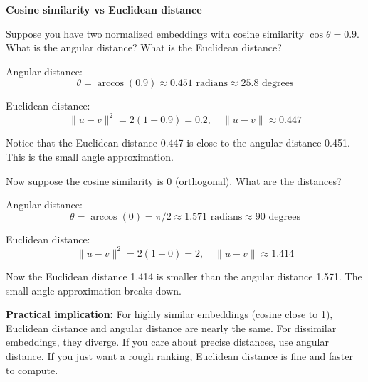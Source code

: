 \begin{examplebox}
\textbf{Cosine similarity vs Euclidean distance}

\vspace{0.5em}

Suppose you have two normalized embeddings with cosine similarity $\cos\theta = 0.9$. What is the angular distance? What is the Euclidean distance?

\vspace{0.5em}

Angular distance:
\begin{equation*}
\theta = \arccos(0.9) \approx 0.451 \text{ radians} \approx 25.8 \text{ degrees}
\end{equation*}

Euclidean distance:
\begin{equation*}
\|u - v\|^2 = 2(1 - 0.9) = 0.2, \quad \|u - v\| \approx 0.447
\end{equation*}

Notice that the Euclidean distance 0.447 is close to the angular distance 0.451. This is the small angle approximation.

\vspace{0.5em}

Now suppose the cosine similarity is 0 (orthogonal). What are the distances?

\vspace{0.5em}

Angular distance:
\begin{equation*}
\theta = \arccos(0) = \pi/2 \approx 1.571 \text{ radians} \approx 90 \text{ degrees}
\end{equation*}

Euclidean distance:
\begin{equation*}
\|u - v\|^2 = 2(1 - 0) = 2, \quad \|u - v\| \approx 1.414
\end{equation*}

Now the Euclidean distance 1.414 is smaller than the angular distance 1.571. The small angle approximation breaks down.

\vspace{0.5em}

\textbf{Practical implication:} For highly similar embeddings (cosine close to 1), Euclidean distance and angular distance are nearly the same. For dissimilar embeddings, they diverge. If you care about precise distances, use angular distance. If you just want a rough ranking, Euclidean distance is fine and faster to compute.
\end{examplebox}

